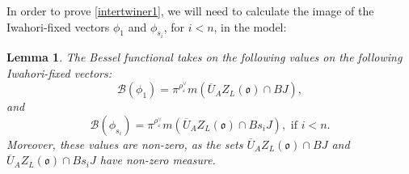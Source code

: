 \documentclass[11pt,letterpaper]{article}
\newcommand{\B}{\mathbb{B}}
\newcommand{\C}{\mathbb{C}}
\newcommand{\calB}{\mathcal{B}}
\newcommand{\ve}{\varepsilon}
\newcommand{\goth}{\mathfrak}
\newtheorem{Lemma}[Theorem]{Lemma}
\theoremstyle{remark}
\newtheorem*{remark}{Remark}
\numberwithin{equation}{section}
\begin{document}




In order to prove \eqref{intertwiner1}, we will need to calculate the image of the Iwahori-fixed vectors $\phi_1$ and $\phi_{s_i}$, for $i<n$, in the model: 

\begin{Lemma}\label{besselvalue}
The Bessel functional takes on the following values on the following Iwahori-fixed vectors:
\begin{equation} \label{phi1}
 \calB(\phi_1) = \pi^{\rho_{\ve}^{\vee}} m(\overline{U}_A Z_L(\goth{o})\cap BJ),
\end{equation}
and
\begin{equation} \label{phis}
\calB(\phi_{s_i}) = \pi^{\rho_{\ve}^{\vee}} m(\overline{U}_AZ_L(\goth{o}) \cap Bs_iJ), \text{ if $i < n$}.
\end{equation}
Moreover, these values are non-zero, as the sets $\overline{U}_AZ_L(\goth{o}) \cap BJ$ and $\overline{U}_AZ_L(\goth{o}) \cap Bs_iJ$ have non-zero measure.
\end{Lemma}
\end{document}
